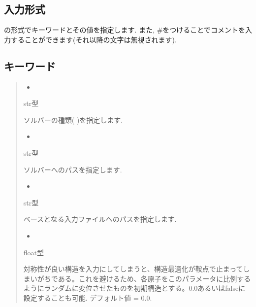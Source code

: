 \documentclass[letterpaper,10pt,dvipdfmx]{sphinxmanual}
\begin{document}
\subsection{入力形式}
\label{\detokenize{file_specification/parameter_solver:id1}}
 の形式でキーワードとその値を指定します.
また, \#をつけることでコメントを入力することができます(それ以降の文字は無視されます).


\subsection{キーワード}
\label{\detokenize{file_specification/parameter_solver:id2}}\begin{quote}
\begin{itemize}
\item {} 

\end{itemize}

 str型

ソルバーの種類( )を指定します.
\begin{itemize}
\item {} 

\end{itemize}

 str型

ソルバーへのパスを指定します.
\begin{itemize}
\item {} 

\end{itemize}

 str型

ベースとなる入力ファイルへのパスを指定します.
\begin{itemize}
\item {} 

\end{itemize}

 float型

対称性が良い構造を入力にしてしまうと、構造最適化が鞍点で止まってしまいがちである。これを避けるため、各原子をこのパラメータに比例するようにランダムに変位させたものを初期構造とする。0.0あるいはfalseに設定することも可能. デフォルト値 = 0.0.
\end{quote}
\end{document}
